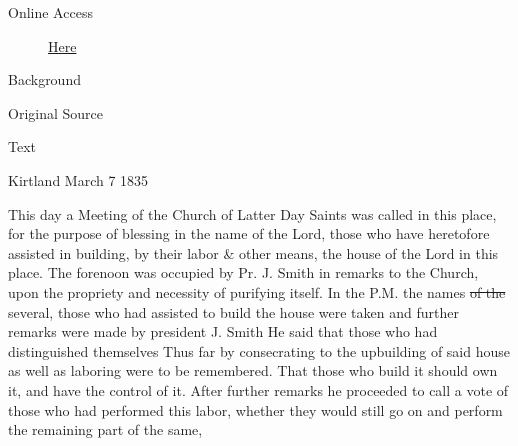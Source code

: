 			\begin{description}
				\item[Online Access] \href{https://www.josephsmithpapers.org/paper-summary/minutes-and-discourses-7-8-march-1835/1}{Here}
			\end{description}
			
			\begin{description}
				\item[Background]
			\end{description}
			
			
			\begin{description}
				\item[Original Source]
			\end{description}
			
			
			\begin{description}
				\item[Text]
			\end{description}
			
				\begin{tightcenter}
				Kirtland March 7 1835
				\end{tightcenter}
				
				This day a Meeting of the Church of Latter Day Saints was called in this place, for the purpose of blessing in the name of the Lord, those who have heretofore assisted in building, by their labor \& other means, the house of the Lord in this place. The forenoon was occupied by Pr. J. Smith  in remarks to the Church, upon the propriety and necessity of purifying itself. In the P.M. the names \sout{of the} several, those who had assisted to build the house were taken and further remarks were made by president J. Smith  He said that those who had distinguished themselves Thus far by consecrating to the upbuilding of said house as well as laboring were to be remembered. That those who build it should own it, and have the control of it. After further remarks he proceeded to call a vote of those who had performed this labor, whether they would still go on and perform the remaining part of the same,
				
